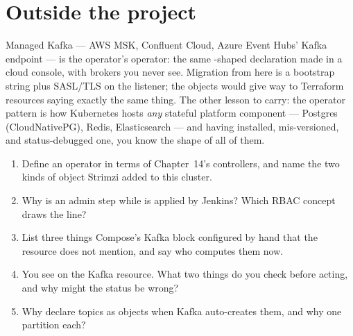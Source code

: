 \section{Outside the project}

Managed Kafka --- AWS MSK, Confluent Cloud, Azure Event Hubs' Kafka
endpoint --- is the operator's operator: the same -shaped
declaration made in a cloud console, with brokers you never see.
Migration from here is a bootstrap string plus SASL/TLS on the
listener; the  objects would give way to Terraform
resources saying exactly the same thing. The other lesson to carry: the
operator pattern is how Kubernetes hosts \emph{any} stateful platform
component --- Postgres (CloudNativePG), Redis, Elasticsearch --- and
having installed, mis-versioned, and status-debugged one, you know the
shape of all of them.

\begin{quiz}
\begin{enumerate}
  \item Define an operator in terms of Chapter~14's controllers, and
  name the two kinds of object Strimzi added to this cluster.
  \item Why is  an admin step while
   is applied by Jenkins? Which RBAC concept draws the
  line?
  \item List three things Compose's Kafka block configured by hand that
  the  resource does not mention, and say who computes them
  now.
  \item You see  on the Kafka resource.
  What two things do you check before acting, and why might the status
  be wrong?
  \item Why declare topics as objects when Kafka auto-creates them, and
  why one partition each?
\end{enumerate}
\end{quiz}
